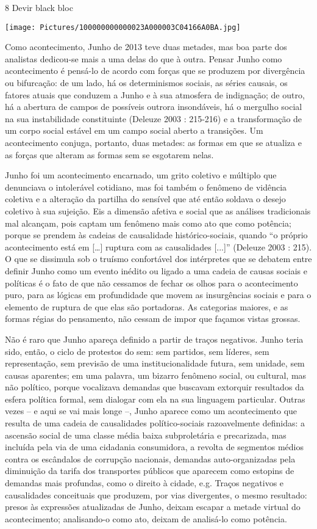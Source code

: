 8 Devir black bloc

\texttt{[image: Pictures/100000000000023A000003C04166A0BA.jpg]}

Como acontecimento, Junho de 2013 teve duas metades, mas boa parte dos
analistas dedicou-se mais a uma delas do que à outra. Pensar Junho como
acontecimento é pensá-lo de acordo com forças que se produzem por
divergência ou bifurcação: de um lado, há os determinismos sociais, as
séries causais, os fatores atuais que conduzem a Junho e à sua atmosfera
de indignação; de outro, há a abertura de campos de possíveis outrora
insondáveis, há o mergulho social na sua instabilidade constituinte
(Deleuze 2003 : 215-216) e a transformação de um corpo social estável em
um campo social aberto a transições. Um acontecimento conjuga, portanto,
duas metades: as formas em que se atualiza e as forças que alteram as
formas sem se esgotarem nelas.

Junho foi um acontecimento encarnado, um grito coletivo e múltiplo que
denunciava o intolerável cotidiano, mas foi também o fenômeno de
vidência coletiva e a alteração da partilha do sensível que até então
soldava o desejo coletivo à sua sujeição. Eis a dimensão afetiva e
social que as análises tradicionais mal alcançam, pois captam um
fenômeno mais como ato que como potência; porque se prendem às cadeias
de causalidade histórico-sociais, quando ``o próprio acontecimento está
em {[}\ldots{}{]} ruptura com as causalidades {[}...{]}'' (Deleuze 2003
: 215). O que se dissimula sob o truísmo confortável dos intérpretes que
se debatem entre definir Junho como um evento inédito ou ligado a uma
cadeia de causas sociais e políticas é o fato de que não cessamos de
fechar os olhos para o acontecimento puro, para as lógicas em
profundidade que movem as insurgências sociais e para o elemento de
ruptura de que elas são portadoras. As categorias maiores, e as formas
régias do pensamento, não cessam de impor que façamos vistas grossas.

Não é raro que Junho apareça definido a partir de traços negativos.
Junho teria sido, então, o ciclo de protestos do sem: sem partidos, sem
líderes, sem representação, sem previsão de uma institucionalidade
futura, sem unidade, sem causas aparentes; em uma palavra, um bizarro
fenômeno social, ou cultural, mas não político, porque vocalizava
demandas que buscavam extorquir resultados da esfera política formal,
sem dialogar com ela na sua linguagem particular. Outras vezes -- e aqui
se vai mais longe --, Junho aparece como um acontecimento que resulta de
uma cadeia de causalidades político-sociais razoavelmente definidas: a
ascensão social de uma classe média baixa subproletária e precarizada,
mas incluída pela via de uma cidadania consumidora, a revolta de
segmentos médios contra os escândalos de corrupção nacionais, demandas
auto-organizadas pela diminuição da tarifa dos transportes públicos que
aparecem como estopins de demandas mais profundas, como o direito à
cidade, e.g. Traços negativos e causalidades conceituais que produzem,
por vias divergentes, o mesmo resultado: presos às expressões
atualizadas de Junho, deixam escapar a metade virtual do acontecimento;
analisando-o como ato, deixam de analisá-lo como potência.

